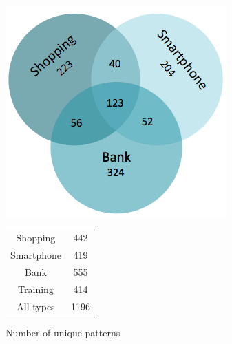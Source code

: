 {{    %
    \begin{figure}[H]
      \centering
      \begin{minipage}[b]{0.40\linewidth}
      \centering
        \includegraphics[scale=0.4]{pics/analysis/uniquePatternsVenn.png}
      \end{minipage}%
      \begin{minipage}[b]{0.30\linewidth}
        \centering
        \begin{tabular}{ c | c }
          \hline
          Shopping &  442 \\
          Smartphone & 419 \\
          Bank & 555 \\
          Training & 414 \\ \hline \hline
          All types & 1196 \\ \hline
        \end{tabular}
        \vspace{1cm}
      \end{minipage}
      \caption{Number of unique patterns}
      \label{fig:test}
    \end{figure}

}}
